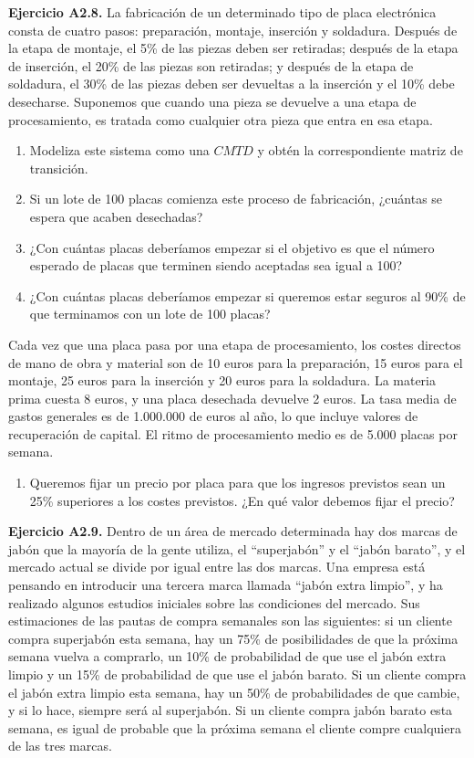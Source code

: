 \documentclass[
]{book}
\providecommand{\tightlist}{%
  \setlength{\itemsep}{0pt}\setlength{\parskip}{0pt}}
\theoremstyle{definition}
\theoremstyle{definition}
\theoremstyle{definition}
\theoremstyle{definition}
\theoremstyle{remark}
\begin{document}
\textbf{Ejercicio A2.8.} La fabricación de un determinado tipo de placa electrónica consta de cuatro pasos: preparación, montaje, inserción y soldadura. Después de la etapa de montaje, el 5\% de las piezas deben ser retiradas; después de la etapa de inserción, el 20\% de las piezas son retiradas; y después de la etapa de soldadura, el 30\% de las piezas deben ser devueltas a la inserción y el 10\% debe desecharse. Suponemos que cuando una pieza se devuelve a una etapa de procesamiento, es tratada como cualquier otra pieza que entra en esa etapa.

\begin{enumerate}
\def\labelenumi{\arabic{enumi}.}
\tightlist
\item
  Modeliza este sistema como una \(CMTD\) y obtén la correspondiente matriz de transición.
\item
  Si un lote de 100 placas comienza este proceso de fabricación, ¿cuántas se espera que acaben desechadas?
\item
  ¿Con cuántas placas deberíamos empezar si el objetivo es que el número esperado de placas que terminen siendo aceptadas sea igual a 100?
\item
  ¿Con cuántas placas deberíamos empezar si queremos estar seguros al 90\% de que terminamos con un lote de 100 placas?
\end{enumerate}

Cada vez que una placa pasa por una etapa de procesamiento, los costes directos de mano de obra y material son de 10 euros para la preparación, 15 euros para el montaje, 25 euros para la inserción y 20 euros para la soldadura. La materia prima cuesta 8 euros, y una placa desechada devuelve 2 euros. La tasa media de gastos generales es de 1.000.000 de euros al año, lo que incluye valores de recuperación de capital. El ritmo de procesamiento medio es de 5.000 placas por semana.

\begin{enumerate}
\def\labelenumi{\arabic{enumi}.}
\setcounter{enumi}{4}
\tightlist
\item
  Queremos fijar un precio por placa para que los ingresos previstos sean un 25\% superiores a los costes previstos. ¿En qué valor debemos fijar el precio?
\end{enumerate}

\textbf{Ejercicio A2.9.} Dentro de un área de mercado determinada hay dos marcas de jabón que la mayoría de la gente utiliza, el ``superjabón'' y el ``jabón barato'', y el mercado actual se divide por igual entre las dos marcas. Una empresa está pensando en introducir una tercera marca llamada ``jabón extra limpio'', y ha realizado algunos estudios iniciales sobre las condiciones del mercado. Sus estimaciones de las pautas de compra semanales son las siguientes: si un cliente compra superjabón esta semana, hay un 75\% de posibilidades de que la próxima semana vuelva a comprarlo, un 10\% de probabilidad de que use el jabón extra limpio y un 15\% de probabilidad de que use el jabón barato. Si un cliente compra el jabón extra limpio esta semana, hay un 50\% de probabilidades de que cambie, y si lo hace, siempre será al superjabón. Si un cliente compra jabón barato esta semana, es igual de probable que la próxima semana el cliente compre cualquiera de las tres marcas.
\end{document}
